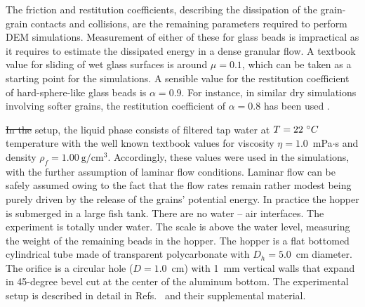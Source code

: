\documentclass[twoside,twocolumn,9pt]{article}
\providecommand{\DIFadd}[1]{{\protect\color{blue}\uwave{#1}}} %
\providecommand{\DIFdel}[1]{{\protect\color{red}\sout{#1}}}                      %
\providecommand{\DIFaddbegin}{} %
\providecommand{\DIFaddend}{} %
\providecommand{\DIFdelbegin}{} %
\providecommand{\DIFdelend}{} %
\newcommand{\DIFscaledelfig}{0.5}
\newlength{\DIFdelgraphicswidth} %
\newlength{\DIFdelgraphicsheight} %
\newcommand{\DIFaddincludegraphics}[2][]{{\color{blue}\fbox{\DIFOincludegraphics[#1]{#2}}}} %
\newcommand{\DIFdelincludegraphics}[2][]{%
\sbox{\DIFdelgraphicsbox}{\DIFOincludegraphics[#1]{#2}}%
\settoboxwidth{\DIFdelgraphicswidth}{\DIFdelgraphicsbox} %
\settoboxtotalheight{\DIFdelgraphicsheight}{\DIFdelgraphicsbox} %
\scalebox{\DIFscaledelfig}{%
\parbox[b]{\DIFdelgraphicswidth}{\usebox{\DIFdelgraphicsbox}\\[-\baselineskip] \rule{\DIFdelgraphicswidth}{0em}}\llap{\resizebox{\DIFdelgraphicswidth}{\DIFdelgraphicsheight}{%
\setlength{\unitlength}{\DIFdelgraphicswidth}%
\begin{picture}(1,1)%
\thicklines\linethickness{2pt} %
{\color[rgb]{1,0,0}\put(0,0){\framebox(1,1){}}}%
{\color[rgb]{1,0,0}\put(0,0){\line( 1,1){1}}}%
{\color[rgb]{1,0,0}\put(0,1){\line(1,-1){1}}}%
\end{picture}%
}\hspace*{3pt}}} %
} %
\DeclareRobustCommand{\DIFaddbegin}{\DIFOaddbegin \let\includegraphics\DIFaddincludegraphics} %
\DeclareRobustCommand{\DIFaddend}{\DIFOaddend \let\includegraphics\DIFOincludegraphics} %
\DeclareRobustCommand{\DIFdelbegin}{\DIFOdelbegin \let\includegraphics\DIFdelincludegraphics} %
\DeclareRobustCommand{\DIFdelend}{\DIFOaddend \let\includegraphics\DIFOincludegraphics} %
\begin{document}
\DIFdelbegin %

\DIFdelend The friction and restitution coefficients, describing the dissipation of the grain-grain contacts and collisions, are the 
remaining parameters required to perform DEM simulations. Measurement of either of these for glass beads is impractical as it requires to estimate the dissipated energy in a dense granular flow. A textbook value for sliding of wet glass surfaces is around $\mu=0.1$, which can be taken as a starting point for the simulations. 
A sensible value for the restitution coefficient of hard-sphere-like glass beads is $\alpha=0.9$. For instance, in similar dry simulations involving softer grains, the restitution coefficient of $\alpha=0.8$ has been used \cite{SchwartzGM12}. 

\DIFdelbegin %

\DIFdel{In the }\DIFdelend \DIFaddbegin \DIFadd{In the experimental }\DIFaddend setup, the liquid phase consists of filtered tap water at $T=22~\degree C$ temperature with the well known textbook values 
for viscosity $\eta = 1.0$~mPa$\cdot$s and density $\rho_f=1.00~\mathrm{g/cm^3}$. Accordingly, these values were used in the 
simulations, with the further assumption of laminar flow conditions. 
Laminar flow can be safely assumed owing to the fact 
that the flow rates remain rather modest being purely 
driven by the release of the grains' potential energy.
In practice the hopper is submerged in a large fish tank. There are 
no water -- air interfaces. The experiment is totally under water. 
The scale is above the water level, measuring the weight of 
the remaining beads in the hopper. 
The hopper is a flat 
bottomed cylindrical tube made of transparent polycarbonate with $D_h = 5.0$~cm diameter. 
The orifice is a circular hole ($D=1.0$~cm) with 1~mm vertical walls that expand in 45-degree bevel cut at the center of the aluminum bottom. 
The experimental setup is described in detail in Refs.~\cite{koivistoSubmitted,koivisto2017PRE} and their supplemental material.

\DIFdelbegin %
\end{document}
